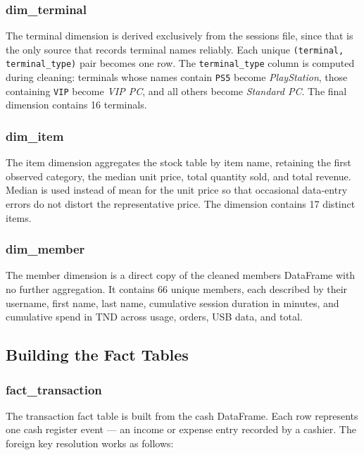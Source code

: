 \subsubsection{dim\_terminal}

The terminal dimension is derived exclusively from the sessions file, since that is
the only source that records terminal names reliably. Each unique \texttt{(terminal,
terminal\_type)} pair becomes one row. The \texttt{terminal\_type} column is computed
during cleaning: terminals whose names contain \texttt{PS5} become \textit{PlayStation},
those containing \texttt{VIP} become \textit{VIP PC}, and all others become
\textit{Standard PC}. The final dimension contains 16 terminals.

\subsubsection{dim\_item}

The item dimension aggregates the stock table by item name, retaining the first
observed category, the median unit price, total quantity sold, and total revenue.
Median is used instead of mean for the unit price so that occasional data-entry errors
do not distort the representative price. The dimension contains 17 distinct items.

\subsubsection{dim\_member}

The member dimension is a direct copy of the cleaned members DataFrame with no
further aggregation. It contains 66 unique members, each described by their username,
first name, last name, cumulative session duration in minutes, and cumulative spend
in TND across usage, orders, USB data, and total.

\subsection{Building the Fact Tables}

\subsubsection{fact\_transaction}

The transaction fact table is built from the cash DataFrame. Each row represents one
cash register event — an income or expense entry recorded by a cashier. The foreign
key resolution works as follows:

